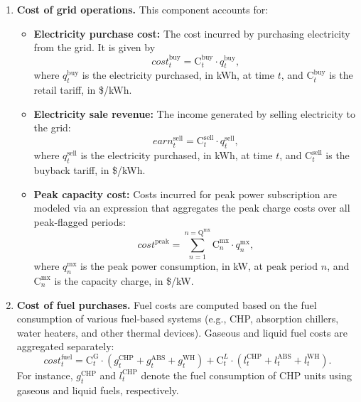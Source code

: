 \documentclass[11pt]{article}
\begin{document}
\begin{enumerate}
    \item \textbf{Cost of grid operations.} This component accounts for:
    \begin{itemize}
        \item \textbf{Electricity purchase cost:} The cost incurred by purchasing electricity from the grid. It is given by 
        \[
        cost^\text{buy}_t = \text{C}^\text{buy}_t \cdot q^\text{buy}_t,
        \]
        where \(q^\text{buy}_t\) is the electricity purchased, in kWh, at time \(t\), and \(\text{C}^\text{buy}_t\) is the retail tariff, in \$/kWh.
        \item \textbf{Electricity sale revenue:} The income generated by selling electricity to the grid:
        \[
        earn^\text{sell}_t = \text{C}^\text{sell}_t \cdot q^\text{sell}_t,
        \]
        where \(q^\text{sell}_t\) is the electricity purchased, in kWh, at time \(t\), and \(\text{C}^\text{sell}_t\) is the buyback tariff, in \$/kWh.
        \item \textbf{Peak capacity cost:} Costs incurred for peak power subscription are modeled via an expression that aggregates the peak charge costs over all peak-flagged periods:
        \[
        cost^\text{peak} = \sum_{n=1}^{n=\text{Q}^\text{mx}} \text{C}^\text{mx}_{n} \cdot q^\text{mx}_n,
        \]
        where \(q^\text{mx}_n\) is the peak power consumption, in kW, at peak period \(n\), and \(\text{C}^\text{mx}_n\) is the capacity charge, in \$/kW.
    \end{itemize}

    \item \textbf{Cost of fuel purchases.} Fuel costs are computed based on the fuel consumption of various fuel-based systems (e.g., CHP, absorption chillers, water heaters, and other thermal devices). Gaseous and liquid fuel costs are aggregated separately:
    \[
    cost^\text{fuel}_t = \text{C}^\text{G}_t \cdot \left( g^\text{CHP}_t + g^\text{ABS}_t + g^\text{WH}_t \right)
    + \text{C}^{L}_t \cdot \left( l^\text{CHP}_t + l^\text{ABS}_t + l^\text{WH}_t \right).
    \]
    For instance, \(g^\text{CHP}_t\) and \(l^\text{CHP}_t\) denote the fuel consumption of CHP units using gaseous and liquid fuels, respectively.



\end{enumerate}
\end{document}
